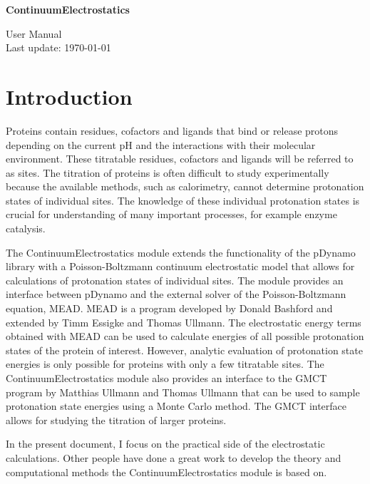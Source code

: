 \documentclass[a4paper,11pt]{article}
\newcommand{\modulename}{ContinuumElectrostatics\xspace}
\begin{document}
\begin{center}
{\LARGE \bf \modulename}

\vspace{0.5cm}
{\Large User Manual\\
Last update: \today}

\end{center}

\vspace{2cm}


\section{Introduction}
Proteins contain residues, cofactors and ligands that bind or release protons 
depending on the current pH and the interactions with their molecular 
environment.
%
These titratable residues, cofactors and ligands will be referred to as sites.
%
The titration of proteins is often difficult to study experimentally because 
the available methods, such as calorimetry, cannot determine protonation states 
of individual sites.
%
The knowledge of these individual protonation states is crucial for 
understanding of many important processes, for example enzyme catalysis.


The \modulename module extends the functionality of the pDynamo 
library with a Poisson-Boltzmann continuum electrostatic model that allows for 
calculations of protonation states of individual sites.
%
The module provides an interface between pDynamo and the external solver of 
the Poisson-Boltzmann equation, MEAD.
%
MEAD is a program developed by Donald Bashford and extended by Timm Essigke
and Thomas Ullmann.
%
The electrostatic energy terms obtained with MEAD can be used to calculate 
energies of all possible protonation states of the protein of interest.
%
However, analytic evaluation of protonation state energies is only possible 
for proteins with only a few titratable sites. 
%
The \modulename module also provides an interface to the GMCT 
program by Matthias Ullmann and Thomas Ullmann that can be used to sample 
protonation state energies using a Monte Carlo method. 
%
The GMCT interface allows for studying the titration of larger proteins.


In the present document, I focus on the practical side of the 
electrostatic calculations.
%
Other people have done a great work to develop the theory and computational 
methods the \modulename module is based on.
%
\end{document}
